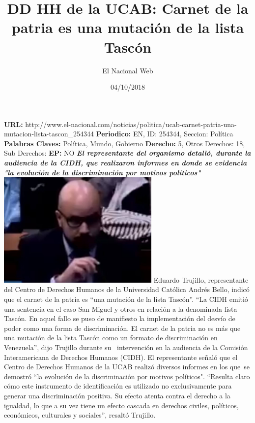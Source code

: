 \documentclass{article}%
\title{\textbf{DD HH de la UCAB: Carnet de la patria es una mutación de la lista Tascón}}%
\author{El Nacional Web}%
\date{04/10/2018}%
\begin{document}
%
\normalsize%
\maketitle%
\textbf{URL: }%
http://www.el{-}nacional.com/noticias/politica/ucab{-}carnet{-}patria{-}una{-}mutacion{-}lista{-}tascon\_254344\newline%
%
\textbf{Periodico: }%
EN, %
ID: %
254344, %
Seccion: %
Política\newline%
%
\textbf{Palabras Claves: }%
Política, Mundo, Gobierno\newline%
%
\textbf{Derecho: }%
5, %
Otros Derechos: %
18, %
Sub Derechos: %
\newline%
%
\textbf{EP: }%
NO\newline%
\newline%
%
\textbf{\textit{El representante del organismo detalló, durante la audiencia de la CIDH, que realizaron informes en donde se evidencia "la evolución de la discriminación por motivos políticos"~}}%
\newline%
\newline%
%
\includegraphics[width=300px]{209.jpg}%
\newline%
%
Eduardo Trujillo, representante del Centro de Derechos Humanos de la Universidad Católica Andrés Bello, indicó que el carnet de la patria es “una mutación de la lista Tascón”.%
\newline%
%
“La CIDH emitió una sentencia en el caso San Miguel y otros en relación a la denominada lista Tascón. En aquel fallo se puso de manifiesto la implementación del desvío de poder como una forma de discriminación. El carnet de la patria no es más que una mutación de la lista Tascón como un formato de discriminación en Venezuela”, dijo Trujillo durante su~ intervención en la audiencia de la Comisión Interamericana de Derechos Humanos (CIDH).%
\newline%
%
El representante señaló que el Centro de Derechos Humanos de la UCAB realizó diversos informes en los que~se demostró “la evolución de la discriminación por motivos políticos".%
\newline%
%
“Resulta claro cómo este instrumento de identificación es utilizado no exclusivamente para generar una discriminación positiva. Su efecto atenta contra el derecho a la igualdad, lo que a su vez tiene un efecto cascada en derechos civiles, políticos, económicos, culturales y sociales”, resaltó Trujillo.%
\newline%
%
\end{document}
